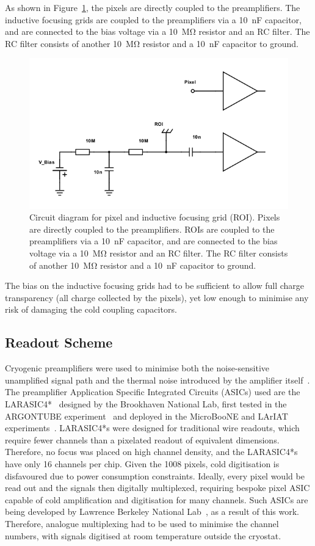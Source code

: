 \documentclass[a4paper]{article}
\begin{document}
As shown in Figure~\ref{fig:circuit}, the pixels are directly coupled to the preamplifiers.
The inductive focusing grids are coupled to the preamplifiers via a \SI{10}{\nano\farad} capacitor, and are connected to the bias voltage via a \SI{10}{\mega\ohm} resistor and an RC filter. 
The RC filter consists of another \SI{10}{\mega\ohm} resistor and a \SI{10}{\nano\farad} capacitor to ground.   

\begin{figure}[htb]
\centering
\includegraphics[width=0.65\linewidth]{Figures/schemeit-project.png}
\caption{Circuit diagram for pixel and inductive focusing grid (ROI). Pixels are directly coupled to the preamplifiers. ROIs are coupled to the preamplifiers via a \SI{10}{\nano\farad} capacitor, and are connected to the bias voltage via a \SI{10}{\mega\ohm} resistor and an RC filter. The RC filter consists of another \SI{10}{\mega\ohm} resistor and a \SI{10}{\nano\farad} capacitor to ground.}
\label{fig:circuit}
\end{figure}

The bias on the inductive focusing grids had to be sufficient to allow full charge transparency (all charge collected by the pixels), yet low enough to minimise any risk of damaging the cold coupling capacitors.

\subsection{Readout Scheme}

Cryogenic preamplifiers were used to minimise both the noise-sensitive unamplified signal path and the thermal noise introduced by the amplifier itself~\cite{art_cold_ero}.
The preamplifier Application Specific Integrated Circuits (ASICs) used are the LARASIC4*~\cite{larasic} designed by the Brookhaven National Lab, first tested in the ARGONTUBE experiment~\cite{art_cold_ero} and deployed in the MicroBooNE and LArIAT experiments~\cite{uboner,lariat}.
LARASIC4*s were designed for traditional wire readouts, which require fewer channels than a pixelated readout of equivalent dimensions. 
Therefore, no focus was placed on high channel density, and the LARASIC4*s have only 16 channels per chip.
Given the 1008 pixels, cold digitisation is disfavoured due to power consumption constraints. 
Ideally, every pixel would be read out and the signals then digitally multiplexed, requiring bespoke pixel ASIC capable of cold amplification and digitisation for many channels.
Such ASICs are being developed by Lawrence Berkeley National Lab~\cite{larpix}, as a result of this work. 
Therefore, analogue multiplexing had to be used to minimise the channel numbers, with signals digitised at room temperature outside the cryostat.
\end{document}
